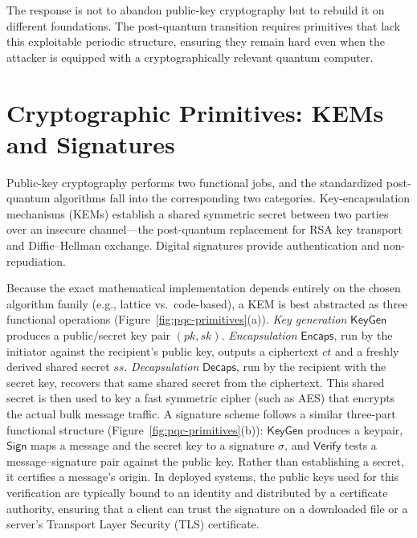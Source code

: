 The response is not to abandon public-key cryptography but to rebuild it on different foundations. The post-quantum transition requires primitives that lack this exploitable periodic structure, ensuring they remain hard even when the attacker is equipped with a cryptographically relevant quantum computer.

\section{Cryptographic Primitives: KEMs and Signatures}
\label{sec:pqc-primitives}

Public-key cryptography performs two functional jobs, and the standardized post-quantum algorithms fall into the corresponding two categories. Key-encapsulation mechanisms (KEMs) establish a shared symmetric secret between two parties over an insecure channel---the post-quantum replacement for RSA key transport and Diffie--Hellman exchange. Digital signatures provide authentication and non-repudiation.

Because the exact mathematical implementation depends entirely on the chosen algorithm family (e.g., lattice vs.\ code-based), a KEM is best abstracted as three functional operations (Figure~\ref{fig:pqc-primitives}(a)). \emph{Key generation} $\mathsf{KeyGen}$ produces a public/secret key pair $(\mathit{pk}, \mathit{sk})$. \emph{Encapsulation} $\mathsf{Encaps}$, run by the initiator against the recipient's public key, outputs a ciphertext $\mathit{ct}$ and a freshly derived shared secret $\mathit{ss}$. \emph{Decapsulation} $\mathsf{Decaps}$, run by the recipient with the secret key, recovers that same shared secret from the ciphertext. This shared secret is then used to key a fast symmetric cipher (such as AES) that encrypts the actual bulk message traffic. A signature scheme follows a similar three-part functional structure (Figure~\ref{fig:pqc-primitives}(b)): $\mathsf{KeyGen}$ produces a keypair, $\mathsf{Sign}$ maps a message and the secret key to a signature $\sigma$, and $\mathsf{Verify}$ tests a message--signature pair against the public key. Rather than establishing a secret, it certifies a message's origin. In deployed systems, the public keys used for this verification are typically bound to an identity and distributed by a certificate authority, ensuring that a client can trust the signature on a downloaded file or a server's Transport Layer Security (TLS) certificate.

